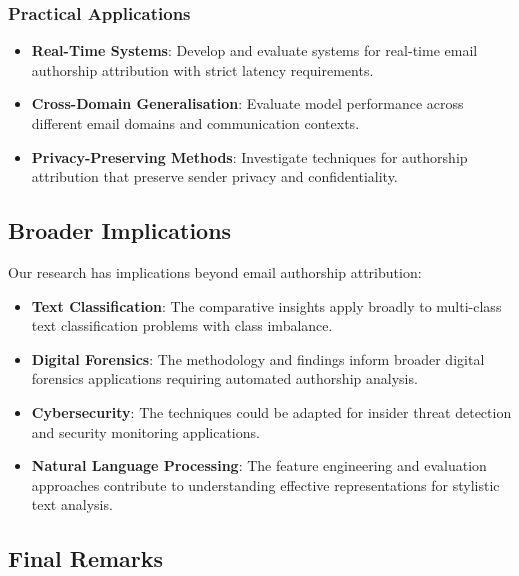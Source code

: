 \documentclass[11pt,a4paper]{article}
\begin{document}
\subsubsection{Practical Applications}

\begin{itemize}
    \item \textbf{Real-Time Systems}: Develop and evaluate systems for real-time email authorship attribution with strict latency requirements.
    
    \item \textbf{Cross-Domain Generalisation}: Evaluate model performance across different email domains and communication contexts.
    
    \item \textbf{Privacy-Preserving Methods}: Investigate techniques for authorship attribution that preserve sender privacy and confidentiality.
\end{itemize}

\subsection{Broader Implications}

Our research has implications beyond email authorship attribution:

\begin{itemize}
    \item \textbf{Text Classification}: The comparative insights apply broadly to multi-class text classification problems with class imbalance.
    
    \item \textbf{Digital Forensics}: The methodology and findings inform broader digital forensics applications requiring automated authorship analysis.
    
    \item \textbf{Cybersecurity}: The techniques could be adapted for insider threat detection and security monitoring applications.
    
    \item \textbf{Natural Language Processing}: The feature engineering and evaluation approaches contribute to understanding effective representations for stylistic text analysis.
\end{itemize}

\subsection{Final Remarks}
\end{document}
